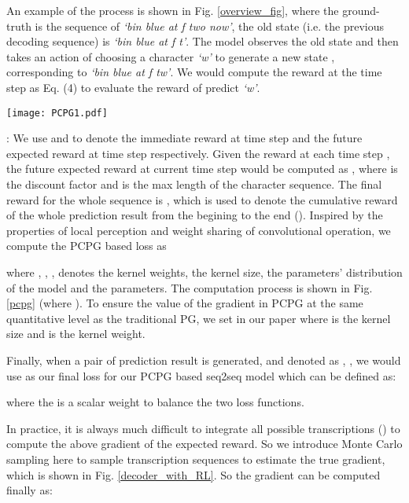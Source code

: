 \documentclass[a4paper, 10pt, conference]{ieeeconf}      \usepackage{FG2020}
\begin{document}
An example of the process is shown in Fig. \ref{overview_fig}, where the ground-truth  is the sequence of \textit{`bin blue at f two now'}, the old state  (i.e. the previous decoding sequence) is \textit{`bin blue at f t'}. The model observes the old state and then takes an action of choosing a character \textit{`w'} to generate a new state , corresponding to \textit{`bin blue at f tw'}. We would compute the reward  at the time step  as Eq. (4) to evaluate the reward of predict \textit{`w'}.

\begin{figure*}
	\centering
\setlength{\abovecaptionskip}{-0.50cm}   \setlength{\belowcaptionskip}{-0.50cm} 
	\texttt{[image: PCPG1.pdf]}
	\caption{The computation process of the PCPG based loss function, where the kernel size  is 5, the stride  is 1, and the kernel weights  is [, , , , ] in this figure.} \label{pcpg}
\end{figure*}

: We use  and  to denote the immediate reward at time step  and the future expected reward at time step  respectively.
Given the reward  at each time step , the future expected reward  at current time step  would be computed as , where  is the discount factor and  is the max length of the character sequence.  The final reward for the whole sequence  is , which is used to denote the cumulative reward of the whole prediction result from the begining to  the end  (). 
Inspired by the properties of local perception and weight sharing of convolutional operation, we compute the PCPG based loss  as


 
where , , ,  denotes the kernel weights, the kernel size, the parameters' distribution of the model and the parameters. The computation process is shown in Fig. \ref{pcpg} (where ). To ensure the value of the gradient in PCPG at the same quantitative level as the traditional PG, we set  in our paper where  is the kernel size and  is the kernel weight.

Finally, when a pair of prediction result is generated, and denoted as , , we would use  as our final loss for our PCPG based seq2seq model which  can be defined as:

where the  is a scalar weight to balance the two loss functions.

In practice, it is always much difficult to integrate all possible transcriptions () to compute the above gradient of the expected reward. So we introduce Monte Carlo sampling here to sample  transcription sequences  to estimate the true gradient, which is shown in Fig. \ref{decoder_with_RL}. So the gradient can be computed finally as:
\end{document}
